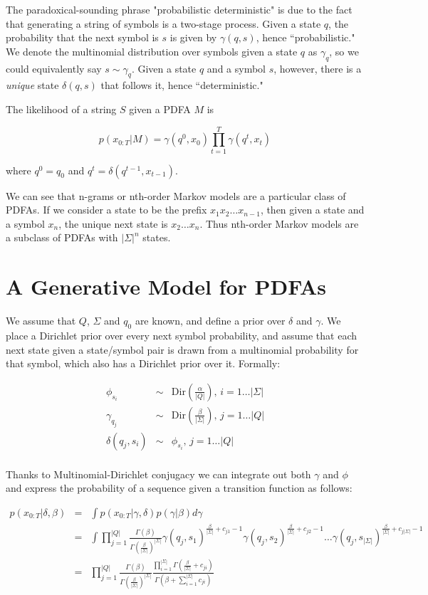 \documentclass[11pt]{article}
\begin{document}
The paradoxical-sounding phrase "probabilistic deterministic" is due to the fact that generating a string of symbols is a two-stage process.  Given a state $q$, the probability that the next symbol is $s$ is given by $\gamma(q,s)$, hence ``probabilistic."  We denote the multinomial distribution over symbols given a state $q$ as $\gamma_q$, so we could equivalently say $s \sim \gamma_q$.  Given a state $q$ and a symbol $s$, however, there is a {\it unique} state $\delta(q,s)$ that follows it, hence ``deterministic."  

The likelihood of a string $S$ given a PDFA $M$ is

\[ p(x_{0:T}|M) = \gamma(q^0,x_0)\prod_{t=1}^T \gamma(q^t,x_t) \]

where $q^0 = q_0$ and $q^t = \delta(q^{t-1},x_{t-1})$.

We can see that n-grams or nth-order Markov models are a particular class of PDFAs.  If we consider a state to be the prefix $x_1 x_2 \ldots x_{n-1}$, then given a state and a symbol $x_n$, the unique next state is $x_2 \ldots x_n$.  Thus nth-order Markov models are a subclass of PDFAs with $|\Sigma|^n$ states.

\section{A Generative Model for PDFAs}

We assume that $Q$, $\Sigma$ and $q_0$ are known, and define a prior over $\delta$ and $\gamma$.  We place a Dirichlet prior over every next symbol probability, and assume that each next state given a state/symbol pair is drawn from a multinomial probability for that symbol, which also has a Dirichlet prior over it.  Formally:

\begin{eqnarray*}
\phi_{s_i}  & \sim & \mathrm{Dir}\left(\frac{\alpha}{|Q|}\right), \, i = 1\ldots |\Sigma| \\
\gamma_{q_j} & \sim & \mathrm{Dir}\left(\frac{\beta}{|\Sigma|}\right), \, j = 1\ldots |Q| \\
\delta(q_j,s_i) & \sim & \phi_{s_i}, \, j = 1\ldots |Q| \\
\end{eqnarray*}

Thanks to Multinomial-Dirichlet conjugacy we can integrate out both $\gamma$ and $\phi$ and express the probability of a sequence given a transition function as follows:

\begin{eqnarray*}
 p(x_{0:T}|\delta,\beta) & = & \int p(x_{0:T}|\gamma,\delta) p(\gamma|\beta) d\gamma \\
 & = &  \int \prod_{j=1}^{|Q|} \frac{\Gamma(\beta)}{\Gamma(\frac{\beta}{|\Sigma|})^{|\Sigma|}} \gamma(q_j,s_1)^{\frac{\beta}{|\Sigma|}+c_{j1}-1} \gamma(q_j,s_2)^{\frac{\beta}{|\Sigma|}+c_{j2}-1} \ldots \gamma(q_j,s_{|\Sigma|})^{\frac{\beta}{|\Sigma|}+c_{j|\Sigma|}-1} \\
 & = & \prod_{j=1}^{|Q|} \frac{\Gamma(\beta)}{\Gamma(\frac{\beta}{|\Sigma|})^{|\Sigma|}} \frac{\prod_{i=1}^{|\Sigma|}\Gamma(\frac{\beta}{|\Sigma|} + c_{ji})}{\Gamma(\beta + \sum_{i=1}^{|\Sigma|} c_{ji})}
 \end{eqnarray*}
 
\end{document}
